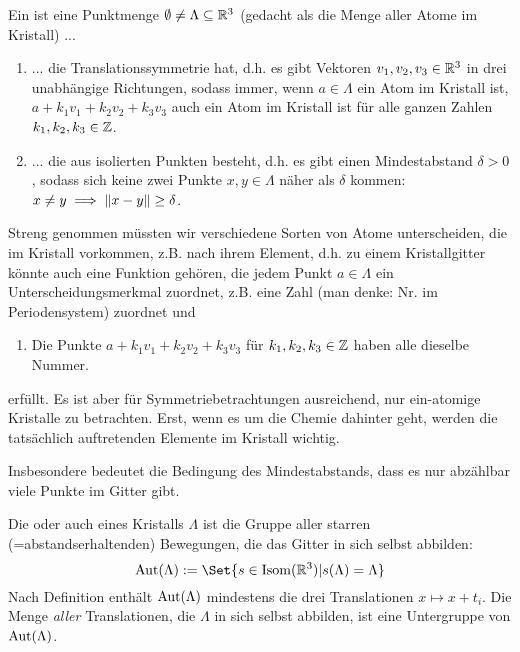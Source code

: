 
\begin{definition}[Kristalle]
Ein  ist eine Punktmenge $\emptyset\neq\Lambda\subseteq\mathbb{R}^3$ (gedacht als die Menge aller Atome im Kristall) ...
\begin{enumerate}
\item ... die Translationssymmetrie hat, d.h. es gibt Vektoren $v_1,v_2,v_3\in\mathbb{R}^3$ in drei unabhängige Richtungen, sodass immer, wenn $a\in\Lambda$ ein Atom im Kristall ist, $a+k_1v_1+k_2v_2+k_3v_3$ auch ein Atom im Kristall ist für alle ganzen Zahlen $k_1,k_2,k_3\in\mathbb{Z}$.
\item ... die aus isolierten Punkten besteht, d.h. es gibt einen Mindestabstand $\delta>0$, sodass sich keine zwei Punkte $x,y\in\Lambda$ näher als $\delta$ kommen: $x\neq y \implies\lVert x-y\rVert\geq\delta$.
\end{enumerate}
Streng genommen müssten wir verschiedene Sorten von Atome unterscheiden, die im Kristall vorkommen, z.B. nach ihrem Element, d.h. zu einem Kristallgitter könnte auch eine Funktion gehören, die jedem Punkt $a\in\Lambda$ ein Unterscheidungsmerkmal zuordnet, z.B. eine Zahl (man denke: Nr. im Periodensystem) zuordnet und
\begin{enumerate}[resume]
\item Die Punkte $a+k_1v_1+k_2v_2+k_3v_3$ für $k_1,k_2,k_3\in\mathbb{Z}$ haben alle dieselbe Nummer.
\end{enumerate}
erfüllt. Es ist aber für Symmetriebetrachtungen ausreichend, nur ein-atomige Kristalle zu betrachten. Erst, wenn es um die Chemie dahinter geht, werden die tatsächlich auftretenden Elemente im Kristall wichtig.
\end{definition}

\begin{remark}
Insbesondere bedeutet die Bedingung des Mindestabstands, dass es nur abzählbar viele Punkte im Gitter gibt.
\end{remark}

\begin{definition}
Die  oder auch  eines Kristalls $\Lambda$ ist die Gruppe aller starren (=abstandserhaltenden) Bewegungen, die das Gitter in sich selbst abbilden:
\[\Aut(\Lambda) := \Set{s\in \operatorname{Isom}(\IR^3) | s(\Lambda)=\Lambda}\]
Nach Definition enthält $\operatorname{Aut}(\Lambda)$ mindestens die drei Translationen $x\mapsto x+t_i$. Die Menge \emph{aller} Translationen, die $\Lambda$ in sich selbst abbilden, ist eine Untergruppe von $\operatorname{Aut}(\Lambda)$.
\end{definition}


